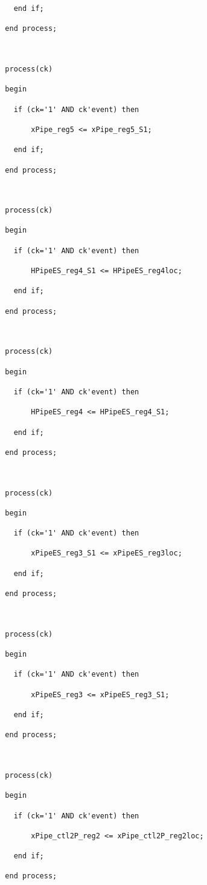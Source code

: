 \begin{verbatim}
    end if;

  end process;



  process(ck)

  begin

    if (ck='1' AND ck'event) then

        xPipe_reg5 <= xPipe_reg5_S1;

    end if;

  end process;



  process(ck)

  begin

    if (ck='1' AND ck'event) then

        HPipeES_reg4_S1 <= HPipeES_reg4loc;

    end if;

  end process;



  process(ck)

  begin

    if (ck='1' AND ck'event) then

        HPipeES_reg4 <= HPipeES_reg4_S1;

    end if;

  end process;



  process(ck)

  begin

    if (ck='1' AND ck'event) then

        xPipeES_reg3_S1 <= xPipeES_reg3loc;

    end if;

  end process;



  process(ck)

  begin

    if (ck='1' AND ck'event) then

        xPipeES_reg3 <= xPipeES_reg3_S1;

    end if;

  end process;



  process(ck)

  begin

    if (ck='1' AND ck'event) then

        xPipe_ctl2P_reg2 <= xPipe_ctl2P_reg2loc;

    end if;

  end process;




\end{verbatim}
